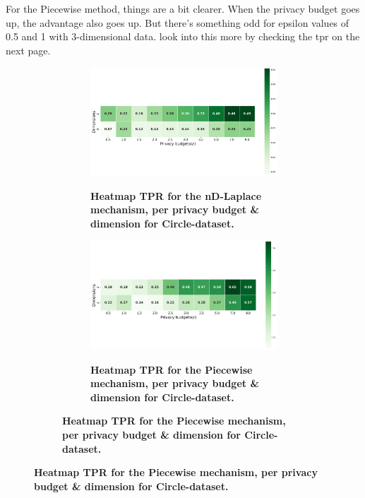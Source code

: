 For the Piecewise method, things are a bit clearer. When the privacy budget goes up, the advantage also goes up. But there's something odd for epsilon values of 0.5 and 1 with 3-dimensional data.  look into this more by checking the \gls{tpr} on the next page.

\newpage
\begin{figure}[H]
  \centering
  \begin{subfigure}[b]{0.9\textwidth}
    \begin{subfigure}[c]{1\textwidth}
      \caption{\textbf{Heatmap TPR for the nD-Laplace mechanism, per privacy budget \& dimension for Circle-dataset.}}
      \includegraphics[width=1\textwidth]{Results/nd-laplace/nd-Laplace/circle-dataset/tpr.png}
      \label{fig:privacy_tpr_circle-dataset_adversial_advantage_kd-laplace}
    \end{subfigure}
    \vfill %

    \begin{subfigure}[c]{1\textwidth}
      \caption{\textbf{Heatmap TPR for the Piecewise mechanism, per privacy budget \& dimension for Circle-dataset.}}
      \includegraphics[width=1\textwidth]{Results/nd-laplace/piecewise/circle-dataset/tpr.png}
      \label{fig:privacy_tpr_circle-dataset_adversial_advantage_piecewise}
    \end{subfigure}
  \end{subfigure}
\end{figure}
